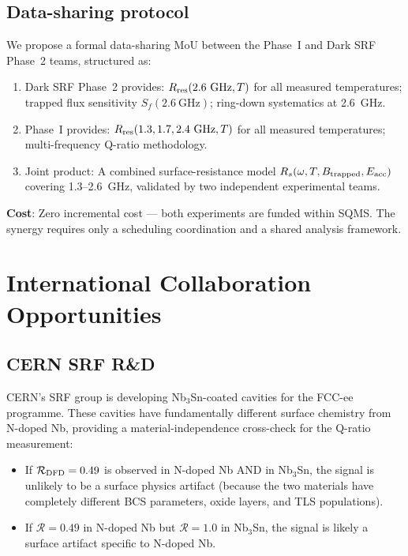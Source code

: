 \documentclass[11pt]{article}
\theoremstyle{definition}
\theoremstyle{remark}
\begin{document}
\subsection{Data-sharing protocol}

We propose a formal data-sharing MoU between the Phase~I and
Dark SRF Phase~2 teams, structured as:

\begin{enumerate}[nosep]
\item Dark SRF Phase~2 provides: $R_{\rm res}(2.6~\text{GHz}, T)$
  for all measured temperatures; trapped flux sensitivity
  $S_f(2.6~\text{GHz})$; ring-down systematics at 2.6~GHz.
\item Phase~I provides: $R_{\rm res}(1.3, 1.7, 2.4~\text{GHz}, T)$
  for all measured temperatures; multi-frequency Q-ratio methodology.
\item Joint product: A combined surface-resistance model
  $R_s(\omega, T, B_{\rm trapped}, E_{\rm acc})$ covering 1.3--2.6~GHz,
  validated by two independent experimental teams.
\end{enumerate}

\textbf{Cost}: Zero incremental cost --- both experiments are funded
within SQMS. The synergy requires only a scheduling coordination
and a shared analysis framework.


\section{International Collaboration Opportunities}
\label{sec:international}

\subsection{CERN SRF R\&D}

CERN's SRF group is developing Nb$_3$Sn-coated cavities for the
FCC-ee programme. These cavities have fundamentally different
surface chemistry from N-doped Nb, providing a material-independence
cross-check for the Q-ratio measurement:

\begin{itemize}[nosep]
\item If $\mathcal{R}_{\rm DFD} = 0.49$ is observed in N-doped Nb
  AND in Nb$_3$Sn, the signal is unlikely to be a surface physics
  artifact (because the two materials have completely different
  BCS parameters, oxide layers, and TLS populations).
\item If $\mathcal{R} = 0.49$ in N-doped Nb but $\mathcal{R} = 1.0$
  in Nb$_3$Sn, the signal is likely a surface artifact specific to
  N-doped Nb.
\end{itemize}
\end{document}

